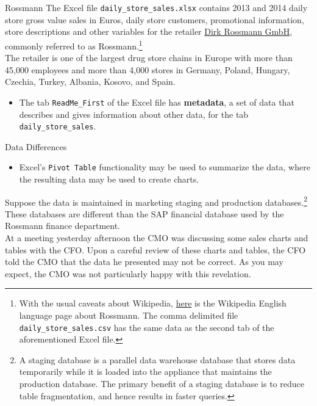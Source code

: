 \documentclass[pdf]{beamer}
\newcommand{\empr}[1]{{\color{franklinblue}\textbf{#1}}}
\theoremstyle{remark}
\theoremstyle{definition}
\begin{document}
\begin{frame}[t]{Rossmann}
The Excel file \texttt{daily\_store\_sales.xlsx} contains 2013 and 2014 daily store gross value sales in Euros, daily store customers, promotional information, store descriptions and other variables for the retailer \href{https://www.rossmann.de/de/}{Dirk Rossmann GmbH}, commonly referred to as Rossmann.\footnote{With the usual caveats about Wikipedia, \href{https://en.wikipedia.org/wiki/Rossmann_(company}{here} is the Wikipedia English language page about Rossmann.  The comma delimited file \texttt{daily\_store\_sales.csv} has the same data as the second tab of the aforementioned Excel file.}  \\
\vspace{1.5ex}
The retailer is one of the largest drug store chains in Europe with more than 45,000 employees and more than 4,000 stores in Germany, Poland, Hungary, Czechia, Turkey, Albania, Kosovo, and Spain.  \\
\vspace{0.5ex}
\small
\begin{itemize}
\item The tab \texttt{ReadMe\_First} of the Excel file has \empr{metadata}, a set of data that describes and gives information about other data, for the tab \texttt{daily\_store\_sales}.
\end{itemize}
\end{frame}

\begin{frame}[t]{Data Differences}
\small
\begin{itemize}
\item Excel's \texttt{Pivot Table} functionality may be used to summarize the data, where the resulting data may be used to create charts. 
\end{itemize}
\vspace{-1.5ex}
\normalsize
Suppose the data is maintained in marketing staging and production databases.\footnote{A staging database is a parallel data warehouse database that stores data temporarily while it is loaded into the appliance that maintains the production database. The primary benefit of a staging database is to reduce table fragmentation, and hence results in faster queries.}  These databases are different than the SAP financial database used by the Rossmann finance department.  \\
\vspace{1.5ex}
At a meeting yesterday afternoon the CMO was discussing some sales charts and tables with the CFO.  Upon a careful review of these charts and tables, the CFO told the CMO that the data he presented may not be correct. As you may expect, the CMO was not particularly happy with this revelation. \\
\end{frame}
\end{document}
